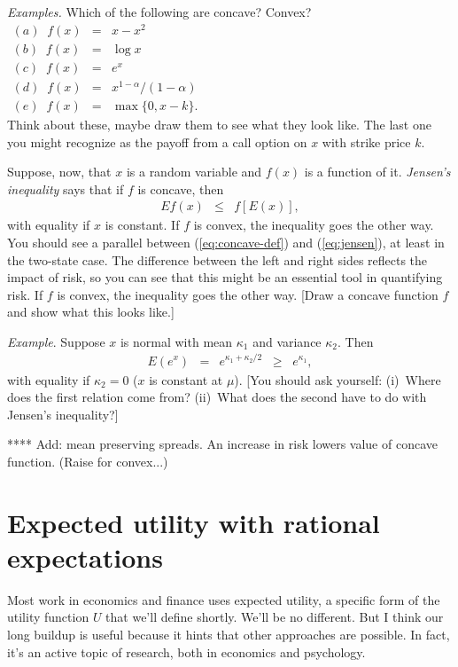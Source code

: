\documentclass[11pt]{article}
\begin{document}
{\it Examples.\/}
Which of the following are concave?  Convex?
\begin{eqnarray*}
    (a) \;\; f(x) &=& x - x^2 \\
    (b) \;\; f(x) &=& \log x  \\
    (c) \;\; f(x) &=& e^x \\
    (d) \;\; f(x) &=& x^{1-\alpha}/(1-\alpha) \\
    (e) \;\; f(x) &=& \max \{ 0, x-k \} .
    \phantom{xxxxxxxxxxxxxxxxxxxxxxxxxxxxxxxxxxxxxxx}
\end{eqnarray*}
Think about these, maybe draw them to see what they look like.
The last one you might recognize as the payoff from
a call option on $x$ with strike price $k$.


Suppose, now, that $x$ is a random variable and $f(x)$ is a function
of it.
{\it Jensen's inequality\/} says that if $f$ is concave, then
\begin{eqnarray}
    E f(x) &\leq& f [E(x)] ,
    \label{eq:jensen}
\end{eqnarray}
with equality if $x$ is constant.
If $f$ is convex, the inequality goes the other way.
You should see a parallel between
(\ref{eq:concave-def}) and (\ref{eq:jensen}), at least in the two-state case.
The difference between the left and right sides reflects
the impact of risk, so you can see that this might be
an essential tool in quantifying risk.
If $f$ is convex, the inequality goes the other way.
[Draw a concave function $f$ and show what this looks like.]

{\it Example\/}.
Suppose $x$ is normal with mean $\kappa_1$ and variance $\kappa_2$.
Then
\begin{eqnarray*}
    E \left( e^x \right) &=&  e^{\kappa_1 + \kappa_2/2}
            \;\;\geq\;\; e^{\kappa_1},
\end{eqnarray*}
with equality if $\kappa_2 = 0$ ($x$ is constant at $\mu$).
[You should ask yourself:
(i)~Where does the first relation come from?
(ii)~What does the second have to do with Jensen's inequality?]

**** Add:  mean preserving spreads.  An increase in risk lowers value of concave function.
(Raise for convex...) 


\section{Expected utility with rational expectations}

Most work in economics and finance uses expected utility,
a specific form of the utility function $U$ that we'll define shortly.
We'll be no different.
But I think our long buildup is useful because it hints
that other approaches are possible.
In fact, it's an active topic of research,
both in economics and psychology.
\end{document}
